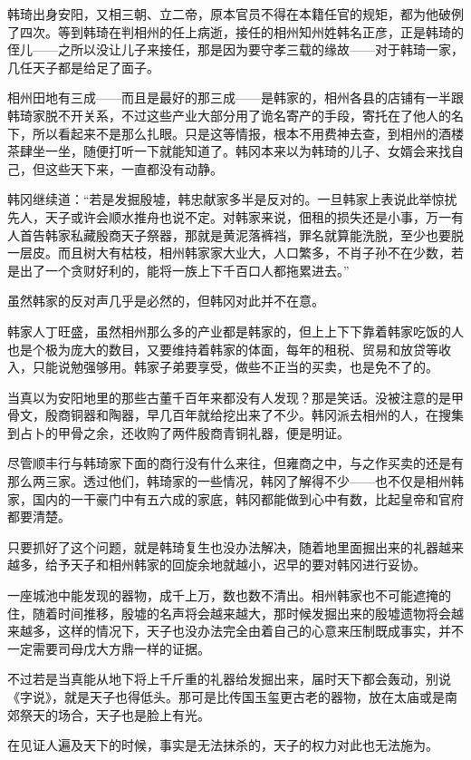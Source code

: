 韩琦出身安阳，又相三朝、立二帝，原本官员不得在本籍任官的规矩，都为他破例了四次。等到韩琦在判相州的任上病逝，接任的相州知州姓韩名正彦，正是韩琦的侄儿——之所以没让儿子来接任，那是因为要守孝三载的缘故——对于韩琦一家，几任天子都是给足了面子。

相州田地有三成——而且是最好的那三成——是韩家的，相州各县的店铺有一半跟韩琦家脱不开关系，不过这些产业大部分用了诡名寄产的手段，寄托在了他人的名下，所以看起来不是那么扎眼。只是这等情报，根本不用费神去查，到相州的酒楼茶肆坐一坐，随便打听一下就能知道了。韩冈本来以为韩琦的儿子、女婿会来找自己，但这些天下来，一直都没有动静。

韩冈继续道：“若是发掘殷墟，韩忠献家多半是反对的。一旦韩家上表说此举惊扰先人，天子或许会顺水推舟也说不定。对韩家来说，佃租的损失还是小事，万一有人首告韩家私藏殷商天子祭器，那就是黄泥落裤裆，罪名就算能洗脱，至少也要脱一层皮。而且树大有枯枝，相州韩家家大业大，人口繁多，不肖子孙不在少数，若是出了一个贪财好利的，能将一族上下千百口人都拖累进去。”

虽然韩家的反对声几乎是必然的，但韩冈对此并不在意。

韩家人丁旺盛，虽然相州那么多的产业都是韩家的，但上上下下靠着韩家吃饭的人也是个极为庞大的数目，又要维持着韩家的体面，每年的租税、贸易和放贷等收入，只能说勉强够用。韩家子弟要享受，做些不正当的买卖，也是免不了的。

当真以为安阳地里的那些古董千百年来都没有人发现？那是笑话。没被注意的是甲骨文，殷商铜器和陶器，早几百年就给挖出来了不少。韩冈派去相州的人，在搜集到占卜的甲骨之余，还收购了两件殷商青铜礼器，便是明证。

尽管顺丰行与韩琦家下面的商行没有什么来往，但雍商之中，与之作买卖的还是有那么两三家。透过他们，韩琦家的一些情况，韩冈了解得不少——也不仅是相州韩家，国内的一干豪门中有五六成的家底，韩冈都能做到心中有数，比起皇帝和官府都要清楚。

只要抓好了这个问题，就是韩琦复生也没办法解决，随着地里面掘出来的礼器越来越多，给予天子和相州韩家的回旋余地就越小，迟早的要对韩冈进行妥协。

一座城池中能发现的器物，成千上万，数也数不清出。相州韩家也不可能遮掩的住，随着时间推移，殷墟的名声将会越来越大，那时候发掘出来的殷墟遗物将会越来越多，这样的情况下，天子也没办法完全由着自己的心意来压制既成事实，并不一定需要司母戊大方鼎一样的证据。

不过若是当真能从地下将上千斤重的礼器给发掘出来，届时天下都会轰动，别说《字说》，就是天子也得低头。那可是比传国玉玺更古老的器物，放在太庙或是南郊祭天的场合，天子也是脸上有光。

在见证人遍及天下的时候，事实是无法抹杀的，天子的权力对此也无法施为。

